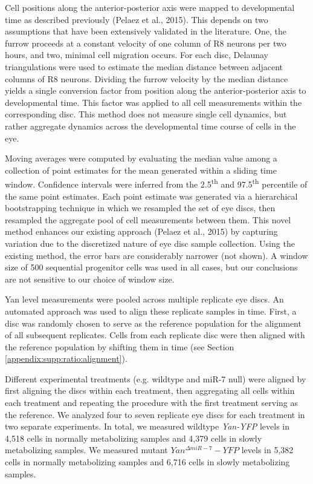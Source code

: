 Cell positions along the anterior-posterior axis were mapped to developmental time as described previously (Pelaez et al., 2015). This depends on two assumptions that have been extensively validated in the literature. One, the furrow proceeds at a constant velocity of one column of R8 neurons per two hours, and two, minimal cell migration occurs. For each disc, Delaunay triangulations were used to estimate the median distance between adjacent columns of R8 neurons. Dividing the furrow velocity by the median distance yields a single conversion factor from position along the anterior-posterior axis to developmental time. This factor was applied to all cell measurements within the corresponding disc. This method does not measure single cell dynamics, but rather aggregate dynamics across the developmental time course of cells in the eye.

Moving averages were computed by evaluating the median value among a collection of point estimates for the mean generated within a sliding time window. Confidence intervals were inferred from the 2.5\textsuperscript{th} and 97.5\textsuperscript{th} percentile of the same point estimates. Each point estimate was generated via a hierarchical bootstrapping technique in which we resampled the set of eye discs, then resampled the aggregate pool of cell measurements between them. This novel method enhances our existing approach (Pelaez et al., 2015) by capturing variation due to the discretized nature of eye disc sample collection. Using the existing method, the error bars are considerably narrower (not shown). A window size of 500 sequential progenitor cells was used in all cases, but our conclusions are not sensitive to our choice of window size. 

Yan level measurements were pooled across multiple replicate eye discs. An automated approach was used to align these replicate samples in time. First, a disc was randomly chosen to serve as the reference population for the alignment of all subsequent replicates. Cells from each replicate disc were then aligned with the reference population by shifting them in time (see Section \ref{appendix:supp:ratio:alignment}). 

Different experimental treatments (e.g. wildtype and miR-7 null) were aligned by first aligning the discs within each treatment, then aggregating all cells within each treatment and repeating the procedure with the first treatment serving as the reference. We analyzed four to seven replicate eye discs for each treatment in two separate experiments. In total, we measured wildtype \textit{Yan-YFP} levels in 4,518 cells in normally metabolizing samples and 4,379 cells in slowly metabolizing samples. We measured mutant $Yan^{\Delta miR-7}-YFP$ levels in 5,382 cells in normally metabolizing samples and 6,716 cells in slowly metabolizing samples.


